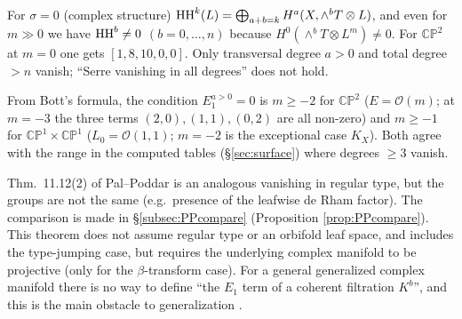 \begin{rem}\tP\label{rem:total}
For $\sigma=0$ (complex structure) $\mathrm{HH}^k(L)=\bigoplus_{a+b=k}H^a(X,\wedge^bT\otimes L)$, and even for $m\gg0$ we have $\mathrm{HH}^b\ne0$ $(b=0,\dots,n)$ because $H^0(\wedge^bT\otimes L^m)\ne0$. For $\mathbb{CP}^2$ at $m=0$ one gets $[1,8,10,0,0]$. Only transversal degree $a>0$ and total degree $>n$ vanish; ``Serre vanishing in all degrees'' does not hold.
\end{rem}
\begin{rem}
From Bott's formula, the condition $E_1^{a>0}=0$ is $m\ge-2$ for $\mathbb{CP}^2$ ($E=\mathcal O(m)$; at $m=-3$ the three terms $(2,0),(1,1),(0,2)$ are all non-zero) and $m\ge-1$ for $\mathbb{CP}^1\times\mathbb{CP}^1$ ($L_0=\mathcal O(1,1)$; $m=-2$ is the exceptional case $K_X$). Both agree with the range in the computed tables (\S\ref{sec:surface}) where degrees $\ge3$ vanish.
\end{rem}
\begin{rem}
Thm.~11.12(2) of Pal--Poddar \cite{PP} is an analogous vanishing in regular type, but the groups are not the same (e.g.\ presence of the leafwise de Rham factor). The comparison is made in \S\ref{subsec:PPcompare} (Proposition \ref{prop:PPcompare}). This theorem does not assume regular type or an orbifold leaf space, and includes the type-jumping case, but requires the underlying complex manifold to be projective (only for the $\beta$-transform case). For a general generalized complex manifold there is no way to define ``the $E_1$ term of a coherent filtration $K^b$'', and this is the main obstacle to generalization \tK.
\end{rem}

